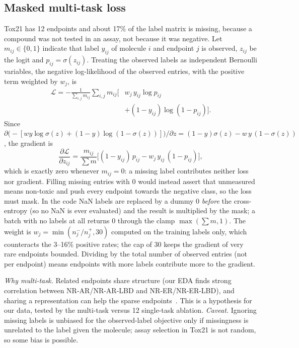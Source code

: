 \subsection{Masked multi-task loss}
Tox21 has 12 endpoints and about 17\% of the label matrix is missing, because a compound was not tested in an assay, not because it was negative. Let $m_{ij}\in\{0,1\}$ indicate that label $y_{ij}$ of molecule $i$ and endpoint $j$ is observed, $z_{ij}$ be the logit and $p_{ij}=\sigma(z_{ij})$. Treating the observed labels as independent Bernoulli variables, the negative log-likelihood of the observed entries, with the positive term weighted by $w_j$, is
\begin{equation}
\begin{aligned}
\mathcal L = -\frac{1}{\sum_{i,j}m_{ij}}\sum_{i,j}m_{ij}\Big[&
w_j\,y_{ij}\log p_{ij}\\
&+(1-y_{ij})\log(1-p_{ij})\Big].
\end{aligned}
\end{equation}
Since $\partial\big(-[w y\log\sigma(z)+(1-y)\log(1-\sigma(z))]\big)/\partial z=(1-y)\sigma(z)-w\,y\,(1-\sigma(z))$, the gradient is
\begin{equation}
\frac{\partial\mathcal L}{\partial z_{ij}}=\frac{m_{ij}}{\sum m}\Big[(1-y_{ij})\,p_{ij}-w_j\,y_{ij}\,(1-p_{ij})\Big],
\end{equation}
which is exactly zero whenever $m_{ij}=0$: a missing label contributes neither loss nor gradient. Filling missing entries with 0 would instead assert that unmeasured means non-toxic and push every endpoint towards the negative class, so the loss must mask. In the code NaN labels are replaced by a dummy 0 \emph{before} the cross-entropy (so no NaN is ever evaluated) and the result is multiplied by the mask; a batch with no labels at all returns 0 through the clamp $\max(\sum m,1)$. The weight is $w_j=\min(n^-_j/n^+_j,30)$ computed on the training labels only, which counteracts the 3--16\% positive rates; the cap of 30 keeps the gradient of very rare endpoints bounded. Dividing by the total number of observed entries (not per endpoint) means endpoints with more labels contribute more to the gradient.

\emph{Why multi-task.} Related endpoints share structure (our EDA finds strong correlation between NR-AR/NR-AR-LBD and NR-ER/NR-ER-LBD), and sharing a representation can help the sparse endpoints~\cite{caruana1997multitask,mayr2016deeptox}. This is a hypothesis for our data, tested by the multi-task versus 12 single-task ablation. \emph{Caveat.} Ignoring missing labels is unbiased for the observed-label objective only if missingness is unrelated to the label given the molecule; assay selection in Tox21 is not random, so some bias is possible.
